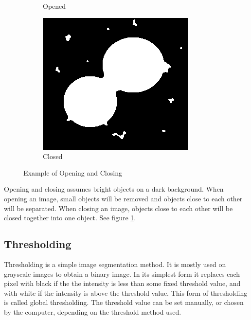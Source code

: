 \begin{figure}[ht]
\begin{subfigure}{.33\textwidth}
        \caption{Opened}
    \end{subfigure}%
    \begin{subfigure}{.33\textwidth}
        \centering
        \includegraphics[width=.99\linewidth]{images/literature/morphological/closing}
        \caption{Closed}
    \end{subfigure}
    \caption{Example of Opening and Closing}
    \label{fig:dots_opening_closing}
\end{figure}

Opening and closing assumes bright objects on a dark background. When opening an image, small objects will be removed and objects close to each other will be separated. When closing an image, objects close to each other will be closed together into one object. See figure \ref{fig:dots_opening_closing}.




\subsection{Thresholding}

Thresholding is a simple image segmentation method. It is mostly used on grayscale images to obtain a binary image. In its simplest form it replaces each pixel with black if the the intensity is less than some fixed threshold value, and with white if the intensity is above the threshold value. This form of thresholding is called global thresholding.\cite{website:thresholding}\cite{website:wiki_threshold}
The threshold value can be set manually, or chosen by the computer, depending on the threshold method used. 

